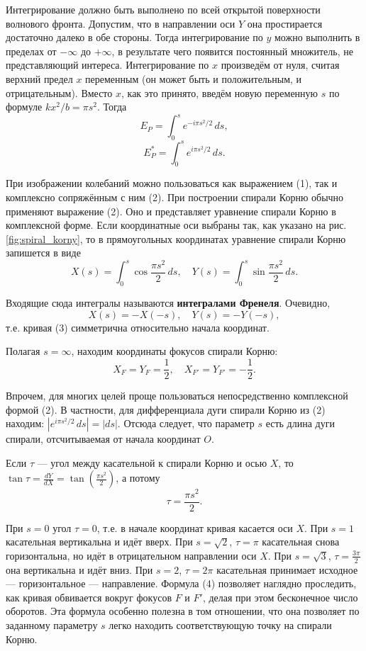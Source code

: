 \documentclass[a4paper,14pt]{article}
\begin{document}
Интегрирование должно быть выполнено по всей открытой поверхности волнового фронта. Допустим, что в направлении оси \( Y \) она простирается достаточно далеко в обе стороны. Тогда интегрирование по \( y \) можно выполнить в пределах от \( -\infty \) до \( +\infty \), в результате чего появится постоянный множитель, не представляющий интереса. Интегрирование по \( x \) произведём от нуля, считая верхний предел \( x \) переменным (он может быть и положительным, и отрицательным). Вместо \( x \), как это принято, введём новую переменную \( s \) по формуле \( kx^2/b = \pi s^2 \). Тогда
\[
E_P = \int_0^s e^{-i\pi s^2/2} \, ds, \tag{1}
\]
\[
E_P^* = \int_0^s e^{i\pi s^2/2} \, ds. \tag{2}
\]

При изображении колебаний можно пользоваться как выражением (1), так и комплексно сопряжённым с ним (2). При построении спирали Корню обычно применяют выражение (2). Оно и представляет уравнение спирали Корню в комплексной форме. Если координатные оси выбраны так, как указано на рис. \ref{fig:spiral_korny}, то в прямоугольных координатах уравнение спирали Корню запишется в виде
\[
X(s) = \int_{0}^{s} \cos \frac{\pi s^2}{2} \, ds, \quad Y(s) = \int_{0}^{s} \sin \frac{\pi s^2}{2} \, ds.
\tag{3}
\]

Входящие сюда интегралы называются \textbf{интегралами Френеля}. Очевидно,
\[
X(s) = -X(-s), \quad Y(s) = -Y(-s),
\]
т.е. кривая (3) симметрична относительно начала координат.

Полагая \( s = \infty \), находим координаты фокусов спирали Корню:
\[
X_F = Y_F = \frac{1}{2}, \quad X_{F'} = Y_{F'} = -\frac{1}{2}.
\]

Впрочем, для многих целей проще пользоваться непосредственно комплексной формой (2). В частности, для дифференциала дуги спирали Корню из (2) находим: \( \left|e^{i\pi s^2/2} \, ds\right| = |ds| \). Отсюда следует, что параметр \( s \) есть длина дуги спирали, отсчитываемая от начала координат \( O \).

Если \( \tau \) — угол между касательной к спирали Корню и осью \( X \), то \( \tan \tau = \frac{dY}{dX} = \tan \left(\frac{\pi s^2}{2}\right) \), а потому
\[
\tau = \frac{\pi s^2}{2}.
\tag{4}
\]

При \( s = 0 \) угол \( \tau = 0 \), т.е. в начале координат кривая касается оси \( X \). При \( s = 1 \) касательная вертикальна и идёт вверх. При \( s = \sqrt{2} \), \( \tau = \pi \) касательная снова горизонтальна, но идёт в отрицательном направлении оси \( X \). При \( s = \sqrt{3} \), \( \tau = \frac{3\pi}{2} \) она вертикальна и идёт вниз. При \( s = 2 \), \( \tau = 2\pi \) касательная принимает исходное — горизонтальное — направление. Формула (4) позволяет наглядно проследить, как кривая обвивается вокруг фокусов \( F \) и \( F' \), делая при этом бесконечное число оборотов. Эта формула особенно полезна в том отношении, что она позволяет по заданному параметру \( s \) легко находить соответствующую точку на спирали Корню.
\end{document}
